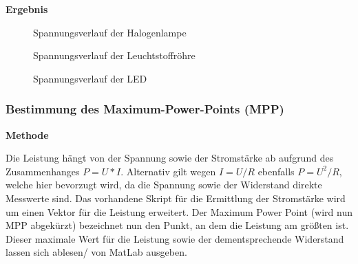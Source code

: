         \vspace{5mm}
        \textbf{Ergebnis}
        \newline
        
        \begin{figure}[H]
            \def\svgwidth{\textwidth}
            
            
            \caption{Spannungsverlauf der Halogenlampe}
        \end{figure}
        
        \begin{figure}[H]
            \def\svgwidth{\textwidth}
            
            
            \caption{Spannungsverlauf der Leuchtstoffröhre}
        \end{figure}
        
        \begin{figure}[H]
            \def\svgwidth{\textwidth}
            
            
            \caption{Spannungsverlauf der LED}
        \end{figure}

    \subsubsection{Bestimmung des Maximum-Power-Points (MPP)}           %
        \textbf{Methode}
        \newline
        \par Die Leistung hängt von der Spannung sowie der Stromstärke ab aufgrund des Zusammenhanges $P=U*I$. Alternativ gilt wegen $I=U/R$ ebenfalls $P=U^2/R$, welche hier bevorzugt wird, da die Spannung sowie der Widerstand direkte Messwerte sind. Das vorhandene Skript für die Ermittlung der Stromstärke wird um einen Vektor für die Leistung erweitert.
        Der Maximum Power Point (wird nun MPP abgekürzt) bezeichnet nun den Punkt, an dem die Leistung am größten ist. Dieser maximale Wert für die Leistung sowie der dementsprechende Widerstand lassen sich ablesen/ von MatLab ausgeben. 
        
